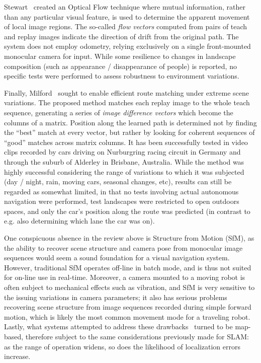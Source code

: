 \documentclass[twocolumn, 9pt,fleqn]{jsproceedings}
\begin{document}
Stewart~\cite{STE12} created an Optical Flow technique where mutual information, rather than any particular visual feature, is used to determine the apparent movement of local image regions. The so-called \textit{flow vectors} computed from pairs of teach and replay images indicate the direction of drift from the original path. The system does not employ odometry, relying exclusively on a single front-mounted monocular camera for input. While some resilience to changes in landscape composition (such as appearance / disappearance of people) is reported, no specific tests were performed to assess robustness to environment variations.

Finally, Milford~\cite{MIL12} sought to enable efficient route matching under extreme scene variations. The proposed method matches each replay image to the whole teach sequence, generating a series of \textit{image difference vectors} which become the columns of a matrix. Position along the learned path is determined not by finding the ``best'' match at every vector, but rather by looking for coherent sequences of ``good'' matches across matrix columns. It has been successfully tested in video clips recorded by cars driving on Nurburgring racing circuit in Germany and through the suburb of Alderley in Brisbane, Australia. While the method was highly successful considering the range of variations to which it was subjected (day / night, rain, moving cars, seasonal changes, etc), results can still be regarded as somewhat limited, in that no tests involving actual autonomous navigation were performed, test landscapes were restricted to open outdoors spaces, and only the car's position along the route was predicted (in contrast to e.g. also determining which lane the car was on).

One conspicuous absence in the review above is Structure from Motion (SfM), as the ability to recover scene structure and camera pose from monocular image sequences would seem a sound foundation for a visual navigation system. However, traditional SfM operates off-line in batch mode, and is thus not suited for on-line use in real-time. Moreover, a camera mounted to a moving robot is often subject to mechanical effects such as vibration, and SfM is very sensitive to the issuing variations in camera parameters; it also has serious problems recovering scene structure from image sequences recorded during simple forward motion, which is likely the most common movement mode for a traveling robot. Lastly, what systems attempted to address these drawbacks~\cite{BEA97,ROY07} turned to be map-based, therefore subject to the same considerations previously made for SLAM: as the range of operation widens, so does the likelihood of localization errors increase.
\end{document}
